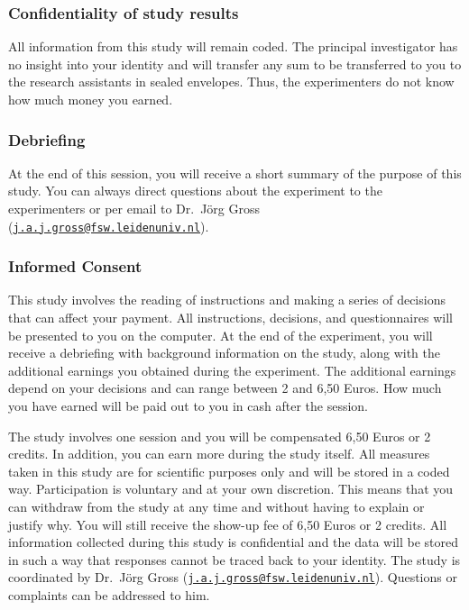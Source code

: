 \documentclass[
  man]{apa6}
\begin{document}
\hypertarget{confidentiality-of-study-results}{%
\subsubsection{Confidentiality of study results}\label{confidentiality-of-study-results}}

All information from this study will remain coded. The principal investigator has no insight into your identity and will transfer any sum to be transferred to you to the research assistants in sealed envelopes. Thus, the experimenters do not know how much money you earned.

\hypertarget{debriefing}{%
\subsubsection{Debriefing}\label{debriefing}}

At the end of this session, you will receive a short summary of the purpose of this study. You can always direct questions about the experiment to the experimenters or per email to Dr.~Jörg Gross (\href{mailto:j.a.j.gross@fsw.leidenuniv.nl}{\nolinkurl{j.a.j.gross@fsw.leidenuniv.nl}}).

\hypertarget{informed-consent}{%
\subsubsection{Informed Consent}\label{informed-consent}}

This study involves the reading of instructions and making a series of decisions that can affect your payment. All instructions, decisions, and questionnaires will be presented to you on the computer. At the end of the experiment, you will receive a debriefing with background information on the study, along with the additional earnings you obtained during the experiment. The additional earnings depend on your decisions and can range between 2 and 6,50 Euros. How much you have earned will be paid out to you in cash after the session.

The study involves one session and you will be compensated 6,50 Euros or 2 credits. In addition, you can earn more during the study itself. All measures taken in this study are for scientific purposes only and will be stored in a coded way. Participation is voluntary and at your own discretion. This means that you can withdraw from the study at any time and without having to explain or justify why. You will still receive the show-up fee of 6,50 Euros or 2 credits. All information collected during this study is confidential and the data will be stored in such a way that responses cannot be traced back to your identity. The study is coordinated by Dr.~Jörg Gross (\href{mailto:j.a.j.gross@fsw.leidenuniv.nl}{\nolinkurl{j.a.j.gross@fsw.leidenuniv.nl}}). Questions or complaints can be addressed to him.
\end{document}
